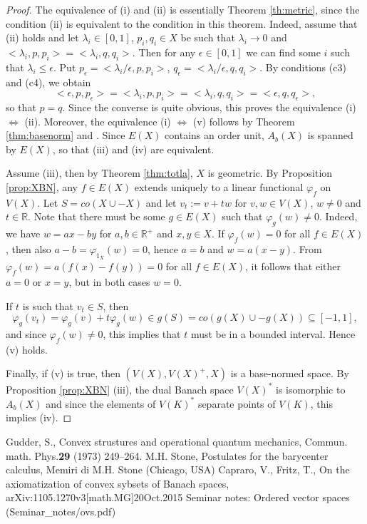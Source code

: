 \documentclass[12pt,letterpaper]{article}
\begin{document}
\begin{proof} The equivalence of (i) and (ii) is essentially Theorem \ref{th:metric}, since the condition (ii) is equivalent to 
the condition in this theorem. Indeed,  assume that (ii) holds and let $\lambda_i\in [0,1]$, $p_i,q_i\in X$ be such that $\lambda_i\to 0$ and $<\lambda_i,p,p_i>=<\lambda_i,q,q_i>$. Then for any $\epsilon\in [0,1]$ we can find some $i$ such that $\lambda_i\le \epsilon$. Put $p_\epsilon=<\lambda_i/\epsilon,p,p_i>$, $q_\epsilon=<\lambda_i/\epsilon,q,q_i>$. By conditions (c3) and (c4), we obtain 
\[
<\epsilon,p,p_\epsilon>=< \lambda_i,p,p_i>=<\lambda_i,q,q_i>=<\epsilon, q, q_\epsilon>,
\]
so that $p=q$. Since the converse is quite obvious, this proves the equivalence (i) $\iff$ (ii). Moreover, the equivalence (i) $\iff$ (v) follows by Theorem \ref{thm:basenorm} and \cite[Prop. 5]{ovs}.  
Since $E(X)$ contains an order unit, $A_b(X)$ is spanned by $E(X)$, so that (iii) and (iv) are equivalent. 

Assume (iii), then by Theorem \ref{thm:totla}, $X$ is geometric. By Proposition \ref{prop:XBN}, any $f\in E(X)$ extends uniquely to a linear functional $\varphi_f$ on $V(X)$. Let $S=co(X\cup -X)$ and let $v_t:=v+tw$ for $v,w\in V(X)$, $w\ne 0$ and $t\in \mathbb R$. 
Note that there must be some $g\in E(X)$ such that $\varphi_g(w)\ne0$. Indeed, we have $w=ax-by$ for $a,b\in \mathbb R^+$ and $x,y\in X$. If $\varphi_f(w)=0$ for all $f\in E(X)$, 
 then also $a-b=\varphi_{1_X}(w)=0$, hence $a=b$ and $w=a(x-y)$. From $\varphi_f(w)=a(f(x)-f(y))=0$ for all $f\in E(X)$, it follows that either $a=0$ or $x=y$, but in both cases $w=0$. 
 
If $t$ is such that  $v_t\in S$, then 
  \[
  \varphi_g(v_t)=\varphi_g(v)+t\varphi_g(w)\in g(S)=co(g(X)\cup -g(X))\subseteq [-1,1],
  \]
   and since $\varphi_f(w)\ne 0$, this implies that $t$ must be in a bounded interval. Hence (v) holds. 

Finally, if (v) is true, then $(V(X), V(X)^+, X)$ is a base-normed space. By Proposition \ref{prop:XBN} (iii), the dual Banach space 
$V(X)^*$ is isomorphic to $A_b(X)$ and since the elements of $V(K)^*$ separate points of $V(K)$, this implies (iv).


\end{proof}







\begin{thebibliography}{WWW}
 Gudder, S., Convex strustures and operational quantum mechanics, Commun. math. Phys.{\bf 29} (1973) 249--264.
 M.H. Stone, Postulates for the barycenter calculus, Memiri di M.H. Stone (Chicago, USA)
 Capraro, V., Fritz, T., On the axiomatization of convex sybsets of Banach spaces, arXiv:1105.1270v3[math.MG]20Oct.2015
 Seminar notes: Ordered vector spaces (Seminar\_notes/ovs.pdf)
\end{thebibliography}
\end{document}
